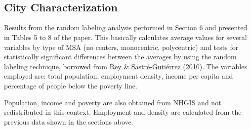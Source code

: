 \documentclass{article}
\begin{document}
    \begin{center}
    \end{center}
    { \hspace*{\fill} \\}
    
    \begin{center}
    \end{center}
    { \hspace*{\fill} \\}
    

    \subsection{City Characterization}


    Results from the random labeling analysis performed in Section 6 and
presented in Tables 5 to 8 of the paper. This basically calculates
average values for several variables by type of MSA (no centers,
monocentric, polycentric) and tests for statistically significant
differences between the averages by using the random labeling technique,
borrowed from
\href{http://www.tandfonline.com/doi/abs/10.1080/17421772.2010.493955\#.U8XSiRYhSao}{Rey
\& Sastré-Gutiérrez (2010)}. The variables employed are: total
population, employment density, income per capita and percentage of
people below the poverty line.

Population, income and poverty are also obtained from NHGIS and not
redistributed in this context. Employment and density are calculated
from the previous data shown in the sections above.
\end{document}
